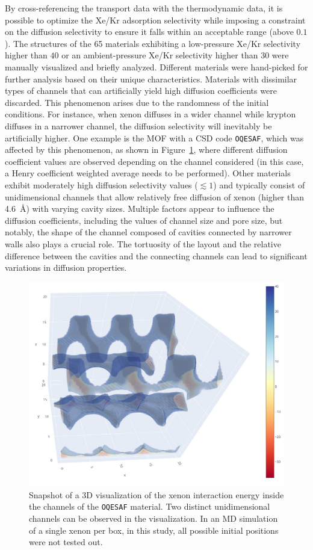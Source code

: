 \documentclass[main]{subfiles}
\begin{document}
By cross-referencing the transport data with the thermodynamic data, it is possible to optimize the Xe/Kr adsorption selectivity while imposing a constraint on the diffusion selectivity to ensure it falls within an acceptable range (above $0.1$). The structures of the 65 materials exhibiting a low-pressure Xe/Kr selectivity higher than $40$ or an ambient-pressure Xe/Kr selectivity higher than $30$ were manually visualized and briefly analyzed. Different materials were hand-picked for further analysis based on their unique characteristics. Materials with dissimilar types of channels that can artificially yield high diffusion coefficients were discarded. This phenomenon arises due to the randomness of the initial conditions. For instance, when xenon diffuses in a wider channel while krypton diffuses in a narrower channel, the diffusion selectivity will inevitably be artificially higher. One example is the MOF with a CSD code \texttt{OQESAF}\autocite{Xie_2011}, which was affected by this phenomenon, as shown in Figure~\ref{fgr:OQESAF}, where different diffusion coefficient values are observed depending on the channel considered (in this case, a Henry coefficient weighted average needs to be performed). Other materials exhibit moderately high diffusion selectivity values ($\lesssim 1$) and typically consist of unidimensional channels that allow relatively free diffusion of xenon (higher than \SI{4.6}{\angstrom}) with varying cavity sizes. Multiple factors appear to influence the diffusion coefficients, including the values of channel size and pore size, but notably, the shape of the channel composed of cavities connected by narrower walls also plays a crucial role. The tortuosity of the layout and the relative difference between the cavities and the connecting channels can lead to significant variations in diffusion properties.

\begin{figure}[ht]
  \centering
    \includegraphics[height=0.4\textwidth]{figures/5-diffusion/viz/OQESAF.jpg}
    \caption{Snapshot of a 3D visualization of the xenon interaction energy inside the channels of the \texttt{OQESAF}\autocite{Xie_2011} material. Two distinct unidimensional channels can be observed in the visualization. In an MD simulation of a single xenon per box, in this study, all possible initial positions were not tested out. }\label{fgr:OQESAF}
\end{figure}
\end{document}
